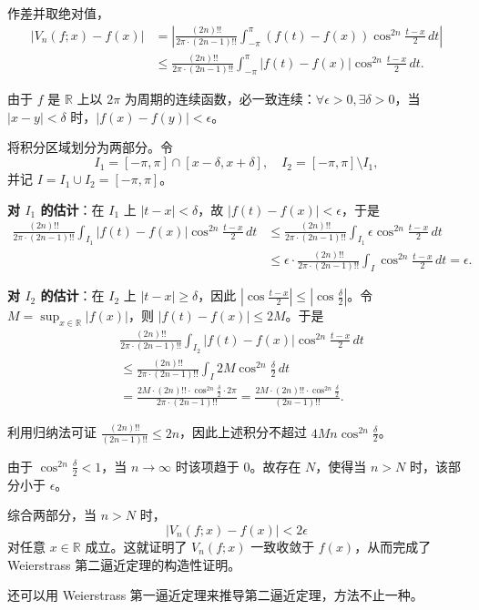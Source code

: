 作差并取绝对值，
\begin{align*}
|V_n(f;x) - f(x)|
&= \left| \frac{(2n)!!}{2\pi\cdot(2n-1)!!}\int_{-\pi}^{\pi} (f(t)-f(x))\cos^{2n}\frac{t-x}{2}\,dt \right| \\
&\leq \frac{(2n)!!}{2\pi\cdot(2n-1)!!}\int_{-\pi}^{\pi} |f(t)-f(x)|\cos^{2n}\frac{t-x}{2}\,dt.
\end{align*}

由于 $f$ 是 $\mathbb{R}$ 上以 $2\pi$ 为周期的连续函数，必一致连续：$\forall\epsilon>0,\exists\delta>0$，当 $|x-y|<\delta$ 时，$|f(x)-f(y)|<\epsilon$。

将积分区域划分为两部分。令
\[
I_1 = [-\pi,\pi] \cap [x-\delta, x+\delta],\quad
I_2 = [-\pi,\pi] \setminus I_1,
\]
并记 $I = I_1 \cup I_2 = [-\pi,\pi]$。

\textbf{对 $I_1$ 的估计}：在 $I_1$ 上 $|t-x|<\delta$，故 $|f(t)-f(x)|<\epsilon$，于是
\begin{align*}
\frac{(2n)!!}{2\pi\cdot(2n-1)!!}\int_{I_1} |f(t)-f(x)|\cos^{2n}\frac{t-x}{2}\,dt
&\leq \frac{(2n)!!}{2\pi\cdot(2n-1)!!}\int_{I_1} \epsilon\cos^{2n}\frac{t-x}{2}\,dt \\
&\leq \epsilon \cdot \frac{(2n)!!}{2\pi\cdot(2n-1)!!}\int_{I}\cos^{2n}\frac{t-x}{2}\,dt = \epsilon.
\end{align*}

\textbf{对 $I_2$ 的估计}：在 $I_2$ 上 $|t-x|\geq\delta$，因此 $\left|\cos\frac{t-x}{2}\right| \leq \left|\cos\frac{\delta}{2}\right|$。令 $M = \sup_{x\in\mathbb{R}}|f(x)|$，则 $|f(t)-f(x)|\leq 2M$。于是
\begin{align*}
&\frac{(2n)!!}{2\pi\cdot(2n-1)!!}\int_{I_2} |f(t)-f(x)|\cos^{2n}\frac{t-x}{2}\,dt \\
&\leq \frac{(2n)!!}{2\pi\cdot(2n-1)!!}\int_{I} 2M\cos^{2n}\frac{\delta}{2}\,dt \\
&= \frac{2M\cdot(2n)!!\cdot\cos^{2n}\frac{\delta}{2}\cdot 2\pi}{2\pi\cdot(2n-1)!!}
= \frac{2M\cdot(2n)!!\cdot\cos^{2n}\frac{\delta}{2}}{(2n-1)!!}.
\end{align*}

利用归纳法可证 $\frac{(2n)!!}{(2n-1)!!} \leq 2n$，因此上述积分不超过 $4Mn\cos^{2n}\frac{\delta}{2}$。

由于 $\cos^{2n}\frac{\delta}{2} < 1$，当 $n\to\infty$ 时该项趋于 $0$。故存在 $N$，使得当 $n>N$ 时，该部分小于 $\epsilon$。

综合两部分，当 $n>N$ 时，
\[
|V_n(f;x) - f(x)| < 2\epsilon
\]
对任意 $x\in\mathbb{R}$ 成立。这就证明了 $V_n(f;x)$ 一致收敛于 $f(x)$，从而完成了 Weierstrass 第二逼近定理的构造性证明。

\begin{remark}
还可以用 Weierstrass 第一逼近定理来推导第二逼近定理，方法不止一种。
\end{remark}